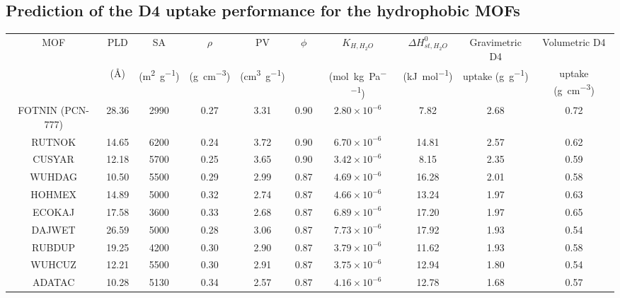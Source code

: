 \subsection{Prediction of the D4 uptake performance for the hydrophobic MOFs}\label{d4-screening}

\begin{widetable}[htb]
    \centering\small
    \caption{%
        Top 10 promising hydrophobic MOF materials identified for D4 uptake at \SI{298}{\kelvin}.
    }\label{tbl:top10}
    \begin{tabular}{@{}cccccccccc@{}}
        \toprule
        MOF & PLD & SA & \(\rho\) & PV & \(\phi\) & \(K_{H,H_{2}O}\) & \(\Delta H_{st,H_{2}O}^{0}\) &
        Gravimetric D4 & Volumetric D4 \\

        & (Å) & (\si{\metre\squared\per\gram}) & (\si{\gram\per\centi\metre\cubed}) & (\si{\centi\metre\cubed\per\gram}) & 
        & (\si{\mol\per\kilo\gram\per\pascal}) & (\si{\kilo\joule\per\mol}) & uptake (\si{\gram\per\gram}) & uptake (\si{\gram\per\centi\metre\cubed}) \\
        \midrule
        FOTNIN (PCN-777) & 28.36 & 2990 & 0.27 & 3.31 & 0.90 & \(2.80\times10^{-6}\) & 7.82 & 2.68 & 0.72\\
        RUTNOK & 14.65 & 6200 & 0.24 & 3.72 & 0.90 & \(6.70\times10^{-6}\) & 14.81 & 2.57 & 0.62\\
        CUSYAR & 12.18 & 5700 & 0.25 & 3.65 & 0.90 & \(3.42\times10^{-6}\) & 8.15 & 2.35 & 0.59\\
        WUHDAG & 10.50 & 5500 & 0.29 & 2.99 & 0.87 & \(4.69\times10^{-6}\) & 16.28 & 2.01 & 0.58\\
        HOHMEX & 14.89 & 5000 & 0.32 & 2.74 & 0.87 & \(4.66\times10^{-6}\) & 13.24 & 1.97 & 0.63\\
        ECOKAJ & 17.58 & 3600 & 0.33 & 2.68 & 0.87 & \(6.89\times10^{-6}\) & 17.20 & 1.97 & 0.65\\
        DAJWET & 26.59 & 5000 & 0.28 & 3.06 & 0.87 & \(7.73\times10^{-6}\) & 17.92 & 1.93 & 0.54\\
        RUBDUP & 19.25 & 4200 & 0.30 & 2.90 & 0.87 & \(3.79\times10^{-6}\) & 11.62 & 1.93 & 0.58\\
        WUHCUZ & 12.21 & 5500 & 0.30 & 2.91 & 0.87 & \(3.75\times10^{-6}\) & 12.94 & 1.80 & 0.54\\
        ADATAC & 10.28 & 5130 & 0.34 & 2.57 & 0.87 & \(4.16\times10^{-6}\) & 12.78 & 1.68 & 0.57\\
        \bottomrule
    \end{tabular}
\end{widetable}

